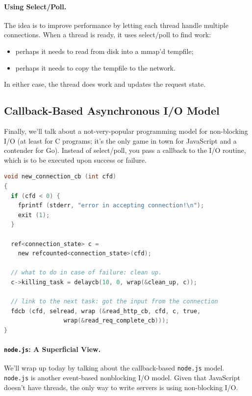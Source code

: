 \paragraph{Using Select/Poll.} The idea is to improve performance
by letting each thread handle multiple connections.
When a thread is ready, it uses select/poll to find work:
    \begin{itemize}
      \item perhaps it needs to read from disk into a mmap'd tempfile;
      \item perhaps it needs to copy the tempfile to the network.
    \end{itemize}

In either case, the thread does work and updates the request state.

\subsection*{Callback-Based Asynchronous I/O Model}
Finally, we'll talk about a not-very-popular programming model for
non-blocking I/O (at least for C programs; it's the only game in town
for JavaScript and a contender for Go).  Instead of select/poll, you
pass a callback to the I/O routine, which is to be executed upon
success or failure.

\begin{lstlisting}[language=C]
void new_connection_cb (int cfd)
{
  if (cfd < 0) {
    fprintf (stderr, "error in accepting connection!\n");
    exit (1);
  }

  ref<connection_state> c = 
    new refcounted<connection_state>(cfd);

  // what to do in case of failure: clean up.
  c->killing_task = delaycb(10, 0, wrap(&clean_up, c));

  // link to the next task: got the input from the connection
  fdcb (cfd, selread, wrap (&read_http_cb, cfd, c, true,
                 wrap(&read_req_complete_cb)));
}
\end{lstlisting}


\paragraph{{\tt node.js}: A Superficial View.} We'll wrap up today 
by talking about the callback-based {\tt node.js} model.
{\tt node.js} is another event-based nonblocking I/O model.
Given that JavaScript doesn't have threads, the only way to write servers
is using non-blocking I/O.

